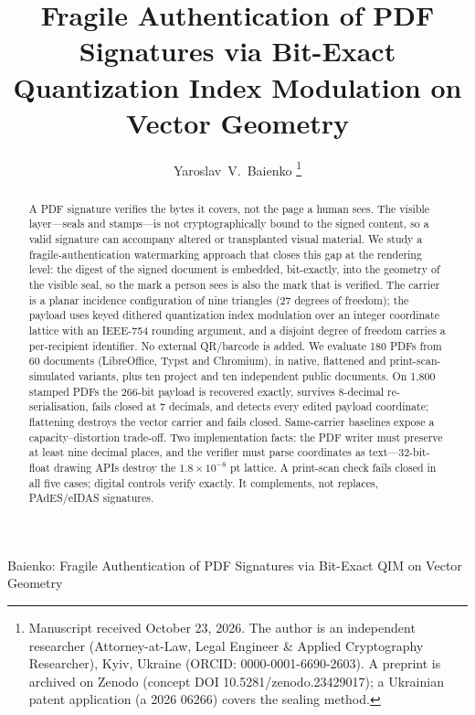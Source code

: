 \documentclass[journal]{IEEEtran}
\begin{document}
\title{Fragile Authentication of PDF Signatures via Bit-Exact Quantization Index Modulation on Vector Geometry}

\author{Yaroslav~V.~Baienko%
\thanks{Manuscript received October 23, 2026. The author is an independent researcher (Attorney-at-Law, Legal Engineer \& Applied Cryptography Researcher), Kyiv, Ukraine (ORCID: 0000-0001-6690-2603). A preprint is archived on Zenodo (concept DOI 10.5281/zenodo.23429017); a Ukrainian patent application (a 2026 06266) covers the sealing method.}}

%
{Baienko: Fragile Authentication of PDF Signatures via Bit-Exact QIM on Vector Geometry}

\maketitle

\begin{abstract}
A PDF signature verifies the bytes it covers, not the page a human sees. The visible layer---seals and stamps---is not cryptographically bound to the signed content, so a valid signature can accompany altered or transplanted visual material. We study a fragile-authentication watermarking approach that closes this gap at the rendering level: the digest of the signed document is embedded, bit-exactly, into the geometry of the visible seal, so the mark a person sees is also the mark that is verified. The carrier is a planar incidence configuration of nine triangles (27 degrees of freedom); the payload uses keyed dithered quantization index modulation over an integer coordinate lattice with an IEEE-754 rounding argument, and a disjoint degree of freedom carries a per-recipient identifier. No external QR/barcode is added. We evaluate 180 PDFs from 60 documents (LibreOffice, Typst and Chromium), in native, flattened and print-scan-simulated variants, plus ten project and ten independent public documents. On 1,800 stamped PDFs the 266-bit payload is recovered exactly, survives 8-decimal re-serialisation, fails closed at 7 decimals, and detects every edited payload coordinate; flattening destroys the vector carrier and fails closed. Same-carrier baselines expose a capacity--distortion trade-off. Two implementation facts: the PDF writer must preserve at least nine decimal places, and the verifier must parse coordinates as text---32-bit-float drawing APIs destroy the $1.8\times10^{-8}$ pt lattice. A print-scan check fails closed in all five cases; digital controls verify exactly. It complements, not replaces, PAdES/eIDAS signatures.
\end{abstract}
\end{document}
